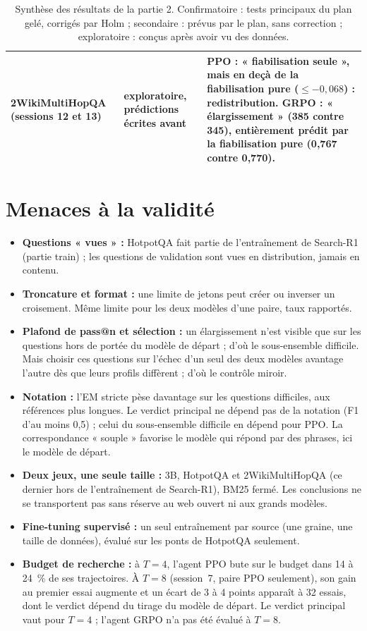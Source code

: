\documentclass[11pt,a4paper]{article}
\begin{document}
\begin{table}[h]
\begin{tabular}{>{\raggedright\arraybackslash}p{3.6cm}>{\raggedright\arraybackslash}p{1.9cm}>{\raggedright\arraybackslash}p{8.6cm}}
2WikiMultiHopQA (sessions 12 et 13) & exploratoire, prédictions écrites avant & PPO : « fiabilisation seule », mais en deçà de la fiabilisation pure ($\leq -0{,}068$) : redistribution. GRPO : « élargissement » (385 contre 345), entièrement prédit par la fiabilisation pure (0,767 contre 0,770). \\
\bottomrule
\end{tabular}
\caption{Synthèse des résultats de la partie 2. Confirmatoire : tests principaux du plan gelé, corrigés par Holm ; secondaire : prévus par le plan, sans correction ; exploratoire : conçus après avoir vu des données.}\label{tab:synthese-p2}
\end{table}

\section{Menaces à la validité}

\begin{itemize}
\item \textbf{Questions « vues » :} HotpotQA fait partie de l'entraînement de Search-R1 (partie train) ; les questions de validation sont vues en distribution, jamais en contenu.
\item \textbf{Troncature et format :} une limite de jetons peut créer ou inverser un croisement. Même limite pour les deux modèles d'une paire, taux rapportés.
\item \textbf{Plafond de pass@n et sélection :} un élargissement n'est visible que sur les questions hors de portée du modèle de départ ; d'où le sous-ensemble difficile. Mais choisir ces questions sur l'échec d'un seul des deux modèles avantage l'autre dès que leurs profils diffèrent ; d'où le contrôle miroir.
\item \textbf{Notation :} l'EM stricte pèse davantage sur les questions difficiles, aux références plus longues. Le verdict principal ne dépend pas de la notation (F1 d'au moins 0,5) ; celui du sous-ensemble difficile en dépend pour PPO. La correspondance « souple » favorise le modèle qui répond par des phrases, ici le modèle de départ.
\item \textbf{Deux jeux, une seule taille :} 3B, HotpotQA et 2WikiMultiHopQA (ce dernier hors de l'entraînement de Search-R1), BM25 fermé. Les conclusions ne se transportent pas sans réserve au web ouvert ni aux grands modèles.
\item \textbf{Fine-tuning supervisé :} un seul entraînement par source (une graine, une taille de données), évalué sur les ponts de HotpotQA seulement.
\item \textbf{Budget de recherche :} à $T = 4$, l'agent PPO bute sur le budget dans 14 à 24~\% de ses trajectoires. À $T = 8$ (session~7, paire PPO seulement), son gain au premier essai augmente et un écart de 3 à 4 points apparaît à 32 essais, dont le verdict dépend du tirage du modèle de départ. Le verdict principal vaut pour $T = 4$ ; l'agent GRPO n'a pas été évalué à $T = 8$.
\end{itemize}



\end{document}
